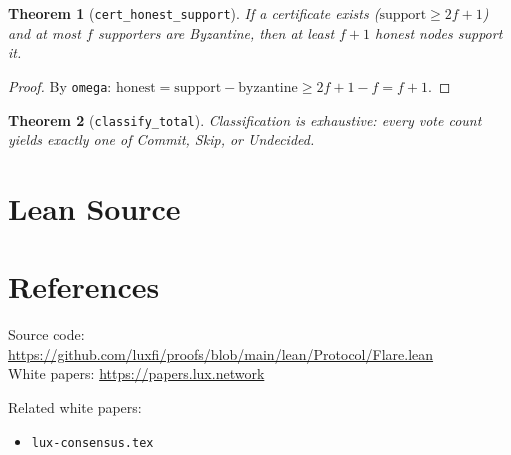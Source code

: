\documentclass[11pt]{article}
\newtheorem{theorem}{Theorem}
\begin{document}
\begin{theorem}[\texttt{cert\_honest\_support}]
If a certificate exists ($\text{support} \geq 2f+1$) and at most $f$ supporters are Byzantine, then at least $f+1$ honest nodes support it.
\end{theorem}
\begin{proof}
By \texttt{omega}: $\text{honest} = \text{support} - \text{byzantine} \geq 2f+1-f = f+1$.
\end{proof}

\begin{theorem}[\texttt{classify\_total}]
Classification is exhaustive: every vote count yields exactly one of Commit, Skip, or Undecided.
\end{theorem}


\section{Lean Source}


\section{References}
\noindent Source code: \url{https://github.com/luxfi/proofs/blob/main/lean/Protocol/Flare.lean}\\
\noindent White papers: \url{https://papers.lux.network}

\noindent Related white papers:
\begin{itemize}
  \item \texttt{lux-consensus.tex}
\end{itemize}
\end{document}
